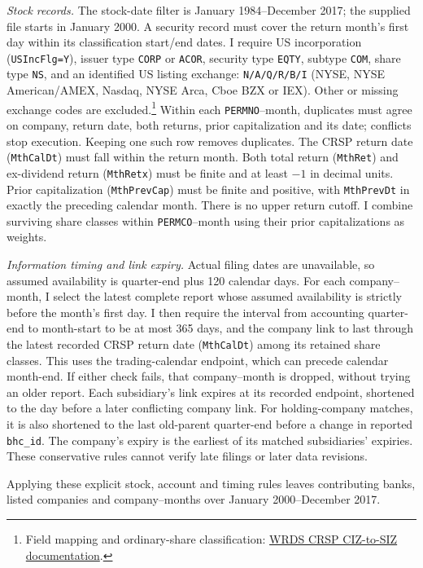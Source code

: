 \documentclass[10pt]{article}
\begin{document}
\textit{Stock records.} The stock-date filter is January 1984--December 2017; the supplied file starts in January 2000. A security record must cover the return month's first day within its classification start/end dates. I require US incorporation (\texttt{USIncFlg=Y}), issuer type \texttt{CORP} or \texttt{ACOR}, security type \texttt{EQTY}, subtype \texttt{COM}, share type \texttt{NS}, and an identified US listing exchange: \texttt{N/A/Q/R/B/I} (NYSE, NYSE American/AMEX, Nasdaq, NYSE Arca, Cboe BZX or IEX). Other or missing exchange codes are excluded.\footnote{Field mapping and ordinary-share classification: \href{https://wrds-www.wharton.upenn.edu/pages/wrds-research/macros/crsp-ciztosiz-macro/}{WRDS CRSP CIZ-to-SIZ documentation}.} Within each \texttt{PERMNO}--month, duplicates must agree on company, return date, both returns, prior capitalization and its date; conflicts stop execution. Keeping one such row removes \StockDuplicates{} duplicates. The CRSP return date (\texttt{MthCalDt}) must fall within the return month. Both total return (\texttt{MthRet}) and ex-dividend return (\texttt{MthRetx}) must be finite and at least $-1$ in decimal units. Prior capitalization (\texttt{MthPrevCap}) must be finite and positive, with \texttt{MthPrevDt} in exactly the preceding calendar month. There is no upper return cutoff. I combine surviving share classes within \texttt{PERMCO}--month using their prior capitalizations as weights.

\textit{Information timing and link expiry.} Actual filing dates are unavailable, so assumed availability is quarter-end plus 120 calendar days. For each company--month, I select the latest complete report whose assumed availability is strictly before the month's first day. I then require the interval from accounting quarter-end to month-start to be at most 365 days, and the company link to last through the latest recorded CRSP return date (\texttt{MthCalDt}) among its retained share classes. This uses the trading-calendar endpoint, which can precede calendar month-end. If either check fails, that company--month is dropped, without trying an older report. Each subsidiary's link expires at its recorded endpoint, shortened to the day before a later conflicting company link. For holding-company matches, it is also shortened to the last old-parent quarter-end before a change in reported \texttt{bhc\_id}. The company's expiry is the earliest of its matched subsidiaries' expiries. These conservative rules cannot verify late filings or later data revisions.

Applying these explicit stock, account and timing rules leaves \MarketBanks{} contributing banks, \MarketCompanies{} listed companies and \MarketObservations{} company--months over January 2000--December 2017.
\end{document}
